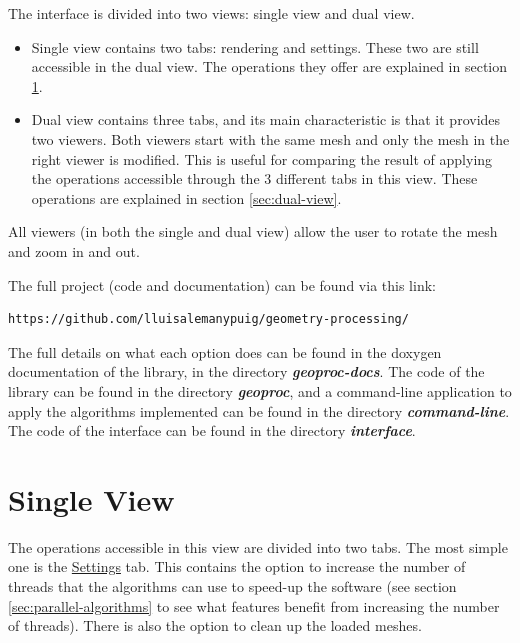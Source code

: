 \documentclass[12pt]{article}
\newcommand \dir[1] {\textbf{\textit{#1}}}
\newcommand \tabbox[1] {\underline{#1}}
\begin{document}
The interface is divided into two views: single view and dual view.
\begin{itemize}
	\item Single view contains two tabs: rendering and settings.
	These two are still accessible in the dual view. The operations
	they offer are explained in section \ref{sec:single-view}.
	
	\item Dual view contains three tabs, and its main characteristic
	is that it provides two viewers. Both viewers start with the same
	mesh and only the mesh in the right viewer is modified. This is
	useful for comparing the result of applying the operations accessible
	through the 3 different tabs in this view. These operations are
	explained in section \ref{sec:dual-view}.
\end{itemize}

All viewers (in both the single and dual view) allow the user to rotate
the mesh and zoom in and out.

\hfill

The full project (code and documentation) can be found via this link:
\begin{verbatim}
https://github.com/lluisalemanypuig/geometry-processing/
\end{verbatim}
The full details on what each option does can be found in the doxygen
documentation of the library, in the directory \dir{geoproc-docs}.
The code of the library can be found in the directory \dir{geoproc},
and a command-line application to apply the algorithms implemented can
be found in the directory \dir{command-line}. The code of the
interface can be found in the directory \dir{interface}.

\section{Single View}
\label{sec:single-view}

The operations accessible in this view are divided into two tabs.
The most simple one is the \tabbox{Settings} tab. This contains the
option to increase the number of threads that the algorithms can use
to speed-up the software (see section \ref{sec:parallel-algorithms}
to see what features benefit from increasing the number of threads).
There is also the option to clean up the loaded meshes.

\hfill
\end{document}
